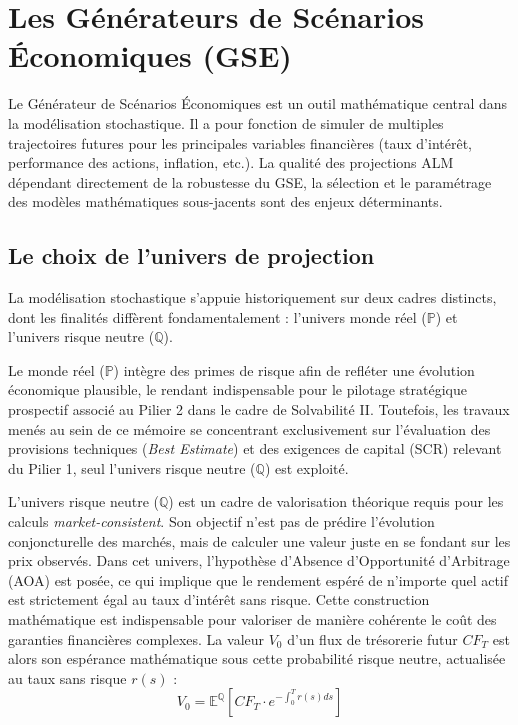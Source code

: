 \section{Les Générateurs de Scénarios Économiques (GSE)}
\label{sec:gse}

Le Générateur de Scénarios Économiques est un outil mathématique central dans la modélisation stochastique. Il a pour fonction de simuler de multiples trajectoires futures pour les principales variables financières (taux d'intérêt, performance des actions, inflation, etc.). La qualité des projections ALM dépendant directement de la robustesse du GSE, la sélection et le paramétrage des modèles mathématiques sous-jacents sont des enjeux déterminants.

\subsection{Le choix de l'univers de projection}

La modélisation stochastique s'appuie historiquement sur deux cadres distincts, dont les finalités diffèrent fondamentalement : l'univers monde réel ($\mathbb{P}$) et l'univers risque neutre ($\mathbb{Q}$). 

Le monde réel ($\mathbb{P}$) intègre des primes de risque afin de refléter une évolution économique plausible, le rendant indispensable pour le pilotage stratégique prospectif associé au Pilier 2 dans le cadre de Solvabilité II. Toutefois, les travaux menés au sein de ce mémoire se concentrant exclusivement sur l'évaluation des provisions techniques (\textit{Best Estimate}) et des exigences de capital (SCR) relevant du Pilier 1, seul l'univers risque neutre ($\mathbb{Q}$) est exploité. 

L'univers risque neutre ($\mathbb{Q}$) est un cadre de valorisation théorique requis pour les calculs \textit{market-consistent}. Son objectif n'est pas de prédire l'évolution conjoncturelle des marchés, mais de calculer une valeur juste en se fondant sur les prix observés. Dans cet univers, l'hypothèse d'Absence d'Opportunité d'Arbitrage (AOA) est posée, ce qui implique que le rendement espéré de n'importe quel actif est strictement égal au taux d'intérêt sans risque. Cette construction mathématique est indispensable pour valoriser de manière cohérente le coût des garanties financières complexes. La valeur $V_0$ d'un flux de trésorerie futur $CF_T$ est alors son espérance mathématique sous cette probabilité risque neutre, actualisée au taux sans risque $r(s)$ :
\begin{equation}
    V_0 = \mathbb{E}^{\mathbb{Q}} \left[ CF_T \cdot e^{-\int_0^T r(s)ds} \right]
    \label{eq:valeur_risque_neutre}
\end{equation}

